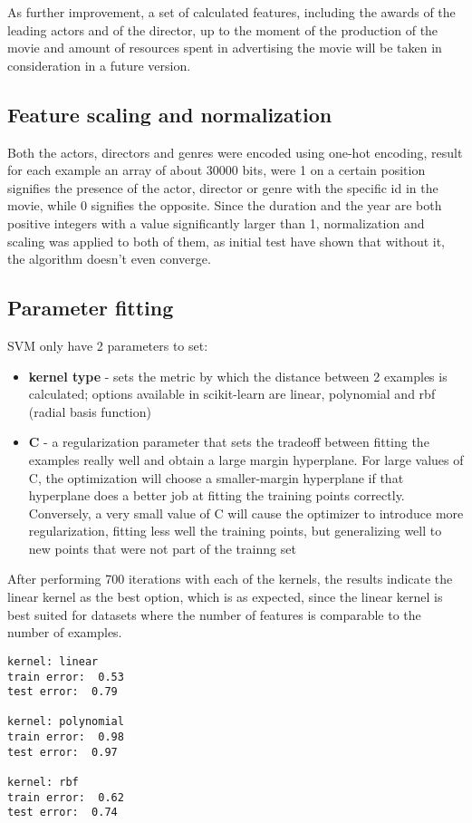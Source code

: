 \documentclass[a4paper,10pt]{article}
\begin{document}
As further improvement, a set of calculated features, including the awards of the leading actors and of the director, up to the moment of the production of the movie and amount of resources spent in advertising  the movie will be taken in consideration in a future version.

\subsection{Feature scaling and normalization}
Both the actors, directors and genres were encoded using one-hot encoding, result for each example an array of about 30000 bits, were 1 on a certain position signifies the presence of the actor, director or genre with the specific id in the movie, while 0 signifies the opposite. Since the duration and the year are both positive integers with a value significantly larger than 1, normalization and scaling was applied to both of them, as initial test have shown that without it, the algorithm doesn't even converge.

\subsection{Parameter fitting}
SVM only have 2 parameters to set:
\begin{itemize}
	\item \textbf{kernel type} - sets the metric by which the distance between 2 examples is calculated; options available in scikit-learn are linear, polynomial and rbf (radial basis function)
	\item \textbf{C} - a regularization parameter that sets the tradeoff between fitting the examples really well and obtain a large margin hyperplane. For large values of C, the optimization will choose a smaller-margin hyperplane if that hyperplane does a better job at fitting the training points correctly. Conversely, a very small value of C will cause the optimizer to introduce more regularization, fitting less well the training points, but generalizing well to new points that were not part of the trainng set
\end{itemize}
	
After performing 700 iterations with each of the kernels, the results indicate the linear kernel as the best option, which is as expected, since the linear kernel is best suited for datasets where the number of features is comparable to the number of examples.
\begin{verbatim}
kernel: linear
train error:  0.53
test error:  0.79

kernel: polynomial
train error:  0.98
test error:  0.97

kernel: rbf
train error:  0.62
test error:  0.74
\end{verbatim}
\end{document}
